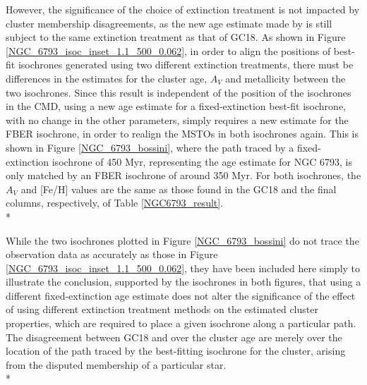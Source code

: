 \documentclass[12pt, a4paper]{report}
\begin{document}
However, the significance of the choice of extinction treatment is not impacted by cluster membership disagreements, as the new age estimate made by \cite{2019A&A...623A.108B} is still subject to the same extinction treatment as that of GC18. As shown in Figure \ref{NGC_6793_isoc_inset_1.1_500_0.062}, in order to align the positions of best-fit isochrones generated using two different extinction treatments, there must be differences in the estimates for the cluster age, $A_{V}$ and metallicity between the two isochrones. Since this result is independent of the position of the isochrones in the CMD, using a new age estimate for a fixed-extinction best-fit isochrone, with no change in the other parameters, simply requires a new estimate for the FBER isochrone, in order to realign the MSTOs in both isochrones again. This is shown in Figure \ref{NGC_6793_bossini}, where the path traced by a fixed-extinction isochrone of 450 Myr, representing the \cite{2019A&A...623A.108B} age estimate for NGC 6793, is only matched by an FBER isochrone of around 350 Myr. For both isochrones, the $A_{V}$ and [Fe/H] values are the same as those found in the GC18 and the final columns, respectively, of Table \ref{NGC6793_result}.\\*

While the two isochrones plotted in Figure \ref{NGC_6793_bossini} do not trace the observation data as accurately as those in Figure \ref{NGC_6793_isoc_inset_1.1_500_0.062}, they have been included here simply to illustrate the conclusion, supported by the isochrones in both figures, that using a different fixed-extinction age estimate does not alter the significance of the effect of using different extinction treatment methods on the estimated cluster properties, which are required to place a given isochrone along a particular path. The disagreement between GC18 and \cite{2019A&A...623A.108B} over the cluster age are merely over the location of the path traced by the best-fitting isochrone for the cluster, arising from the disputed membership of a particular star. \\*
\end{document}

